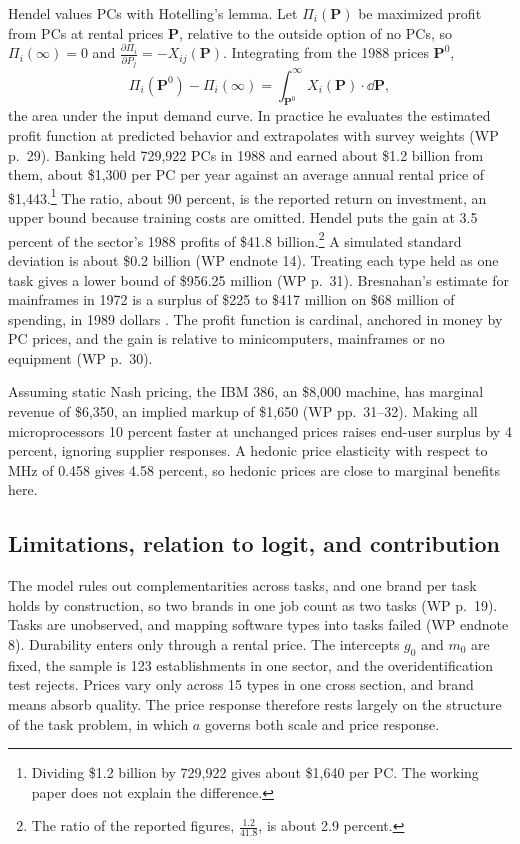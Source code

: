 Hendel values PCs with Hotelling's lemma. Let $\Pi_i(\boldsymbol P)$ be maximized profit from PCs at rental prices
$\boldsymbol P$, relative to the outside option of no PCs, so $\Pi_i(\infty) = 0$ and $\frac{\partial
\Pi_i}{\partial P_j} = -X_{ij}(\boldsymbol P)$. Integrating from the 1988 prices $\boldsymbol P^0$,
\begin{equation*}
\Pi_i(\boldsymbol P^0) - \Pi_i(\infty) = \int_{\boldsymbol P^0}^{\infty} X_i(\boldsymbol P)\cdot\dd\boldsymbol P,
\end{equation*}
the area under the input demand curve. In practice he evaluates the estimated profit function at predicted
behavior and extrapolates with survey weights (WP p.~29). Banking held 729,922 PCs in 1988 and earned about \$1.2
billion from them, about \$1,300 per PC per year against an average annual rental price of
\$1,443.\footnote{Dividing \$1.2 billion by 729,922 gives about \$1,640 per PC. The working paper does not explain
the difference.} The ratio, about 90 percent, is the reported return on investment, an upper bound because
training costs are omitted. Hendel puts the gain at 3.5 percent of the sector's 1988 profits of \$41.8
billion.\footnote{The ratio of the reported figures, $\frac{1.2}{41.8}$, is about 2.9 percent.} A simulated
standard deviation is about \$0.2 billion (WP endnote 14). Treating each type held as one task gives a lower
bound of \$956.25 million (WP p.~31). Bresnahan's estimate for mainframes in 1972 is a surplus of \$225 to \$417
million on \$68 million of spending, in 1989 dollars \citep{Bresnahan1986}. The profit function is cardinal, anchored in money by
PC prices, and the gain is relative to minicomputers, mainframes or no equipment (WP p.~30).

Assuming static Nash pricing, the IBM 386, an \$8,000 machine, has marginal revenue of \$6,350, an implied markup
of \$1,650 (WP pp.~31--32). Making all microprocessors 10 percent faster at unchanged prices raises end-user
surplus by 4 percent, ignoring supplier responses. A hedonic price elasticity with respect to MHz of 0.458
\citep{BerndtGriliches1993} gives 4.58 percent, so hedonic prices are close to marginal benefits here.

\subsection{Limitations, relation to logit, and contribution}\label{sec:07-hendel-assessment}

The model rules out complementarities across tasks, and one brand per task holds by construction, so two brands
in one job count as two tasks (WP p.~19). Tasks are unobserved, and mapping software types into tasks failed (WP
endnote 8). Durability enters only through a rental price. The intercepts $g_0$ and $m_0$ are fixed, the sample is
123 establishments in one sector, and the overidentification test rejects. Prices vary only across 15 types in one
cross section, and brand means absorb quality. The price response therefore rests largely on the structure of the
task problem, in which $a$ governs both scale and price response.

